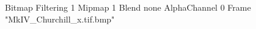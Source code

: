 {Bitmap
	{Filtering 1}
	{Mipmap 1}
	{Blend none}
	{AlphaChannel 0}
	{Frame "MkIV_Churchill_x.tif.bmp"}
}
